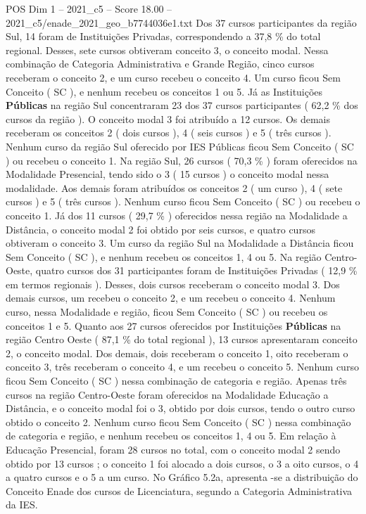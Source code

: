 \begin{textsample}{POS Dim 1 – 2021\_c5 – Score 18.00 – 2021\_c5/enade\_2021\_geo\_b7744036e1.txt}
Dos 37 cursos participantes da região Sul, 14 foram de Instituições Privadas, correspondendo a 37,8 \% do total regional.
Desses, sete cursos obtiveram conceito 3, o conceito modal.
Nessa combinação de Categoria Administrativa e Grande Região, cinco cursos receberam o conceito 2, e um curso recebeu o conceito 4.
Um curso ficou Sem Conceito ( SC ), e nenhum recebeu os conceitos 1 ou 5.
Já as Instituições \textbf{Públicas} na região Sul concentraram 23 dos 37 cursos participantes ( 62,2 \% dos cursos da região ).
O conceito modal 3 foi atribuído a 12 cursos.
Os demais receberam os conceitos 2 ( dois cursos ), 4 ( seis cursos ) e 5 ( três cursos ).
Nenhum curso da região Sul oferecido por IES Públicas ficou Sem Conceito ( SC ) ou recebeu o conceito 1.
Na região Sul, 26 cursos ( 70,3 \% ) foram oferecidos na Modalidade Presencial, tendo sido o 3 ( 15 cursos ) o conceito modal nessa modalidade.
Aos demais foram atribuídos os conceitos 2 ( um curso ), 4 ( sete cursos ) e 5 ( três cursos ).
Nenhum curso ficou Sem Conceito ( SC ) ou recebeu o conceito 1.
Já dos 11 cursos ( 29,7 \% ) oferecidos nessa região na Modalidade a Distância, o conceito modal 2 foi obtido por seis cursos, e quatro cursos obtiveram o conceito 3.
Um curso da região Sul na Modalidade a Distância ficou Sem Conceito ( SC ), e nenhum recebeu os conceitos 1, 4 ou 5.
Na região Centro-Oeste, quatro cursos dos 31 participantes foram de Instituições Privadas ( 12,9 \% em termos regionais ).
Desses, dois cursos receberam o conceito modal 3.
Dos demais cursos, um recebeu o conceito 2, e um recebeu o conceito 4.
Nenhum curso, nessa Modalidade e região, ficou Sem Conceito ( SC ) ou recebeu os conceitos 1 e 5.
Quanto aos 27 cursos oferecidos por Instituições \textbf{Públicas} na região Centro Oeste ( 87,1 \% do total regional ), 13 cursos apresentaram conceito 2, o conceito modal.
Dos demais, dois receberam o conceito 1, oito receberam o conceito 3, três receberam o conceito 4, e um recebeu o conceito 5.
Nenhum curso ficou Sem Conceito ( SC ) nessa combinação de categoria e região.
Apenas três cursos na região Centro-Oeste foram oferecidos na Modalidade Educação a Distância, e o conceito modal foi o 3, obtido por dois cursos, tendo o outro curso obtido o conceito 2.
Nenhum curso ficou Sem Conceito ( SC ) nessa combinação de categoria e região, e nenhum recebeu os conceitos 1, 4 ou 5.
Em relação à Educação Presencial, foram 28 cursos no total, com o conceito modal 2 sendo obtido por 13 cursos ; o conceito 1 foi alocado a dois cursos, o 3 a oito cursos, o 4 a quatro cursos e o 5 a um curso.
No Gráfico 5.2a, apresenta -se a distribuição do Conceito Enade dos cursos de Licenciatura, segundo a Categoria Administrativa da IES.

\end{textsample}
